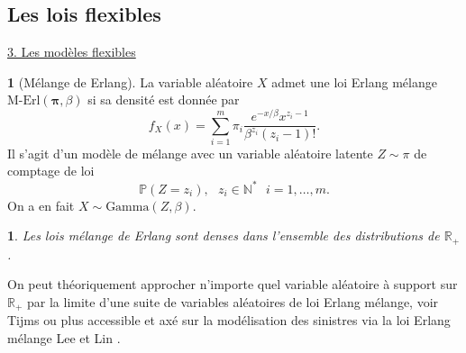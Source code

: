 \documentclass[8pt,notheorems]{beamer}
\def \N{\mathbb N}
\def \P {\mathbb P}
\newcommand{\R}{\mathbb{R}}
\newtheorem{theorem}{\translate{Theorem}}[section]
\newtheorem{theorem}{\translate{Theorem}}
\theoremstyle{definition}
\newtheorem{definition}{\translate{Definition}}
\theoremstyle{example}
\theoremstyle{mystyle}
\theoremstyle{plain}
\begin{document}
\subsection{Les lois flexibles}
\begin{frame}[allowframebreaks]
\underline{3. Les modèles flexibles}\\
\begin{definition}[Mélange de Erlang]
La variable aléatoire $X$ admet une loi Erlang mélange $\text{M-Erl}(\boldsymbol{\pi}, \beta)$ si sa densité est donnée par
$$
f_{X}(x) = \sum_{i=1}^{m}\pi_{i}\frac{e^{-x/\beta}x^{z_i-1}}{\beta^{z_i}(z_i-1)!}.
$$
Il s'agit d'un modèle de mélange avec un variable aléatoire latente $Z\sim\pi$ de comptage de loi
$$
\P(Z=z_i),\text{ }z_i\in\N^{\ast}\text{ }i=1,\ldots, m.
$$
On a en fait $X\sim \text{Gamma}(Z,\beta)$.
\end{definition}
\begin{theorem}
Les lois mélange de Erlang sont denses dans l'ensemble des distributions de $\R_+$.
\end{theorem}
On peut théoriquement approcher n'importe quel variable aléatoire à support sur $\R_+$ par la limite d'une suite de variables aléatoires de loi Erlang mélange, voir Tijms \cite[p. 163-164]{tijms1994stochastic} ou plus accessible et axé sur la modélisation des sinistres via la loi Erlang mélange Lee et Lin \cite{lee2010modeling}.\end{frame}
\end{document}
